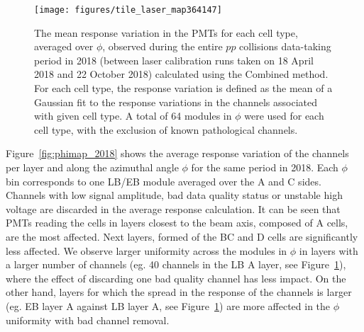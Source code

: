\begin{figure}[htbp]
\centering
    \texttt{[image: figures/tile\_laser\_map364147]}
    \caption{The mean response variation in the PMTs for each cell type, averaged over $\phi$, observed during the entire $pp$ collisions data-taking period in 2018 (between laser calibration runs taken on 18 April 2018 and 22 October 2018) calculated using the Combined method. For each cell type, the response variation is defined as the mean of a Gaussian fit to the response variations in the channels associated with given cell type. A total of 64 modules in $\phi$ were used for each cell type, with the exclusion of known pathological channels.
    }\label{fig:map_2018}
\end{figure}

Figure~\ref{fig:phimap_2018} shows the average response variation of the channels per layer and along the azimuthal angle $\phi$ for the same period in 2018. Each $\phi$ bin corresponds to one LB/EB module averaged over the A and C sides. Channels with low signal amplitude, bad data quality status or unstable high voltage are discarded in the average response calculation. It can be seen that PMTs reading the cells in layers closest to the beam axis, composed of A cells, are the most affected. Next layers, formed of the BC and D cells are significantly less affected. We observe larger uniformity across the modules in $\phi$ in layers with a larger number of channels (eg. 40 channels in the LB A layer, see Figure~\ref{fig:map_2018}), where the effect of discarding one bad quality channel has less impact. On the other hand, layers for which the spread in the response of the channels is larger (eg. EB layer A against LB layer A, see Figure~\ref{fig:map_2018}) are more affected in the $\phi$ uniformity with bad channel removal.

